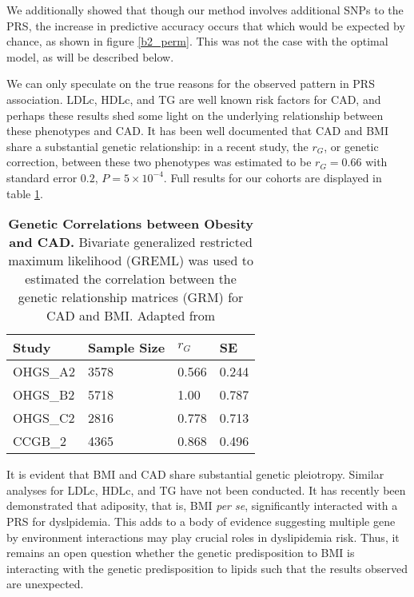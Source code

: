 We additionally showed that though our method involves additional \acp{SNP} to the \ac{PRS}, the increase in predictive accuracy occurs that which would be expected by chance, as shown in figure \ref{b2_perm}. This was not the case with the optimal model, as will be described below. 

We can only speculate on the true reasons for the observed pattern in \ac{PRS} association. \ac{LDLc}, \ac{HDLc}, and \ac{TG} are well known risk factors for \ac{CAD}, and perhaps these results shed some light on the underlying relationship between these phenotypes and \ac{CAD}. It has been well documented that \ac{CAD} and \ac{BMI} share a substantial genetic relationship: in a recent study, the $r_G$, or genetic correction, between these two phenotypes was estimated to be $r_G = 0.66$ with standard error $0.2$, $P = 5 \times 10^{-4}$. \citep{Cole2015a} Full results for our cohorts are displayed in table \ref{rg}. 

\begin{table}[H]
\centering

\begin{tabular}{llll}
\hline
\textbf{Study} & \textbf{Sample Size} & \textbf{$r_G$} & \textbf{SE} \\ \hline
OHGS\_A2       & 3578                 & 0.566          & 0.244       \\
OHGS\_B2       & 5718                 & 1.00           & 0.787       \\
OHGS\_C2       & 2816                 & 0.778          & 0.713       \\
CCGB\_2        & 4365                 & 0.868          & 0.496       \\ \hline
\end{tabular}

\caption[Genetic Correlations between Obesity and \ac{CAD}.]{\textbf{Genetic Correlations between Obesity and \ac{CAD}.} Bivariate generalized restricted maximum likelihood (GREML) was used to estimated the correlation between the genetic relationship matrices (GRM) for \ac{CAD} and \ac{BMI}.  Adapted from \cite{Cole2015a}}
\label{rg}

\end{table}

It is evident that \ac{BMI} and \ac{CAD} share substantial genetic pleiotropy. Similar analyses for \ac{LDLc}, \ac{HDLc}, and \ac{TG} have not been conducted. It has recently been demonstrated that adiposity, that is, \ac{BMI} \textit{per se}, significantly interacted with a \ac{PRS} for dyslpidemia. \citep{Cole2014} This adds to a body of evidence suggesting multiple gene by environment interactions may play crucial roles in dyslipidemia risk. \cite{ColeChristopherB.a;NikpayMajidb;McPhersonRutha} Thus, it remains an open question whether the genetic predisposition to \ac{BMI} is interacting with the genetic predisposition to lipids such that the results observed are unexpected.


